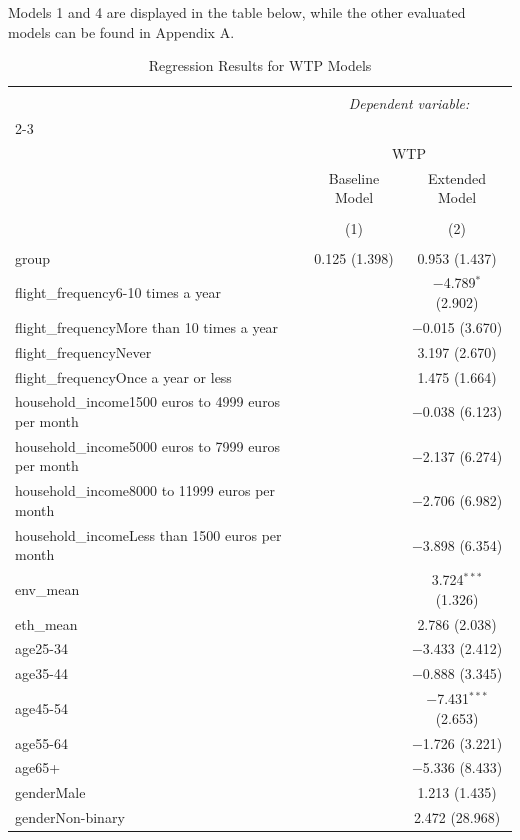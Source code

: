 \documentclass[
]{article}
\begin{document}
Models 1 and 4 are displayed in the table below, while the other
evaluated models can be found in Appendix A.

\begin{table}[!htbp] \centering 
  \caption{Regression Results for WTP Models} 
  \label{} 
\small 
\begin{tabular}{@{\extracolsep{3pt}}lcc} 
\\[-1.8ex]\hline 
\hline \\[-1.8ex] 
 & \multicolumn{2}{c}{\textit{Dependent variable:}} \\ 
\cline{2-3} 
\\[-1.8ex] & \multicolumn{2}{c}{WTP} \\ 
 & Baseline Model & Extended Model \\ 
\\[-1.8ex] & (1) & (2)\\ 
\hline \\[-1.8ex] 
 group & 0.125 (1.398) & 0.953 (1.437) \\ 
  flight\_frequency6-10 times a year &  & $-$4.789$^{*}$ (2.902) \\ 
  flight\_frequencyMore than 10 times a year &  & $-$0.015 (3.670) \\ 
  flight\_frequencyNever &  & 3.197 (2.670) \\ 
  flight\_frequencyOnce a year or less &  & 1.475 (1.664) \\ 
  household\_income1500 euros to 4999 euros per month &  & $-$0.038 (6.123) \\ 
  household\_income5000 euros to 7999 euros per month &  & $-$2.137 (6.274) \\ 
  household\_income8000 to 11999 euros per month &  & $-$2.706 (6.982) \\ 
  household\_incomeLess than 1500 euros per month &  & $-$3.898 (6.354) \\ 
  env\_mean &  & 3.724$^{***}$ (1.326) \\ 
  eth\_mean &  & 2.786 (2.038) \\ 
  age25-34 &  & $-$3.433 (2.412) \\ 
  age35-44 &  & $-$0.888 (3.345) \\ 
  age45-54 &  & $-$7.431$^{***}$ (2.653) \\ 
  age55-64 &  & $-$1.726 (3.221) \\ 
  age65+ &  & $-$5.336 (8.433) \\ 
  genderMale &  & 1.213 (1.435) \\ 
  genderNon-binary &  & 2.472 (28.968) \\ 

\end{tabular}
\end{table}
\end{document}
